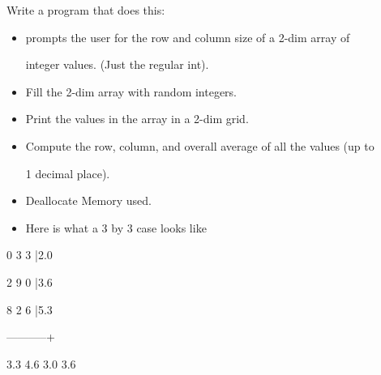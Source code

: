 Write a program that does this:

\begin{itemize}

\item

  prompts the user for the row and column size of a 2-dim array of

  integer values. (Just the regular int).

\item

  Fill the 2-dim array with random integers.

\item

  Print the values in the array in a 2-dim grid.

\item

  Compute the row, column, and overall average of all the values (up to

  1 decimal place).

\item

  Deallocate Memory used.

\item

  Here is what a 3 by 3 case looks like

\end{itemize}



\begin{console}

0    3   3 |2.0

2    9   0 |3.6

8    2   6 |5.3

-----------+



3.3 4.6 3.0 3.6

\end{console}

